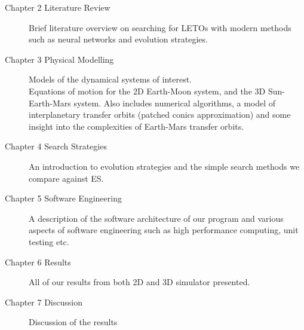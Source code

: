 \begin{description}
	\item[Chapter 2 Literature Review]{Brief literature overview on searching for LETOs with modern methods such as neural networks and evolution strategies.}
	\item[Chapter 3 Physical Modelling]{Models of the dynamical systems of interest. \\ Equations of motion for the 2D Earth-Moon system, and the 3D Sun-Earth-Mars system. Also includes numerical algorithms, a model of interplanetary transfer orbits (patched conics approximation) and some insight into the complexities of Earth-Mars transfer orbits.}
	\item[Chapter 4 Search Strategies]{An introduction to evolution strategies and the simple search methods we compare against ES.}
	\item[Chapter 5 Software Engineering]{A description of the software architecture of our program and various aspects of software engineering such as high performance computing, unit testing etc.}
	\item[Chapter 6 Results]{All of our results from both 2D and 3D simulator presented.}
	\item[Chapter 7 Discussion]{Discussion of the results}
\end{description}

